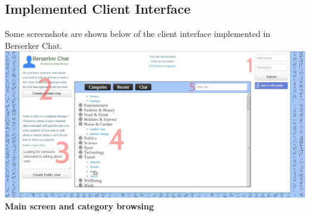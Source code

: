 \documentclass{sig-alt-release2}
\begin{document}
\subsection{Implemented Client Interface}

Some screenshots are shown below of the client interface implemented in Berserker Chat.\\

\includegraphics[scale=0.26]{categories-browsing_1.jpg}
\textbf{Main screen and category browsing}\\
\end{document}
